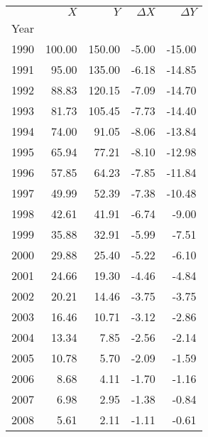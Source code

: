 \begin{tabular}{lrrrr}
\toprule
{} &  \(X\) &  \(Y\) & \(\Delta X\) & \(\Delta Y\) \\
Year &        &        &              &              \\
\midrule
1990 & 100.00 & 150.00 &        -5.00 &       -15.00 \\
1991 &  95.00 & 135.00 &        -6.18 &       -14.85 \\
1992 &  88.83 & 120.15 &        -7.09 &       -14.70 \\
1993 &  81.73 & 105.45 &        -7.73 &       -14.40 \\
1994 &  74.00 &  91.05 &        -8.06 &       -13.84 \\
1995 &  65.94 &  77.21 &        -8.10 &       -12.98 \\
1996 &  57.85 &  64.23 &        -7.85 &       -11.84 \\
1997 &  49.99 &  52.39 &        -7.38 &       -10.48 \\
1998 &  42.61 &  41.91 &        -6.74 &        -9.00 \\
1999 &  35.88 &  32.91 &        -5.99 &        -7.51 \\
2000 &  29.88 &  25.40 &        -5.22 &        -6.10 \\
2001 &  24.66 &  19.30 &        -4.46 &        -4.84 \\
2002 &  20.21 &  14.46 &        -3.75 &        -3.75 \\
2003 &  16.46 &  10.71 &        -3.12 &        -2.86 \\
2004 &  13.34 &   7.85 &        -2.56 &        -2.14 \\
2005 &  10.78 &   5.70 &        -2.09 &        -1.59 \\
2006 &   8.68 &   4.11 &        -1.70 &        -1.16 \\
2007 &   6.98 &   2.95 &        -1.38 &        -0.84 \\
2008 &   5.61 &   2.11 &        -1.11 &        -0.61 \\
\bottomrule
\end{tabular}
